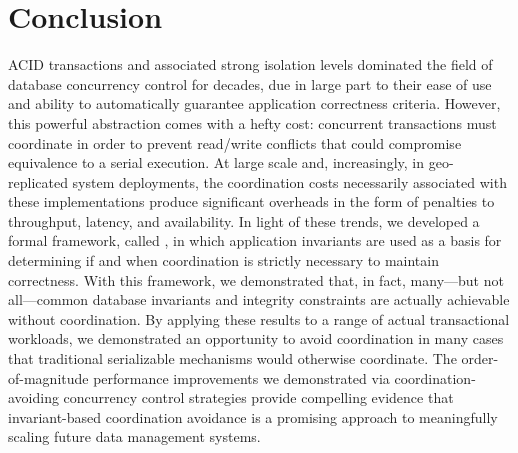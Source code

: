 
\section{Conclusion}
\label{sec:conclusion}

ACID transactions and associated strong isolation levels dominated the
field of database concurrency control for decades, due in large part
to their ease of use and ability to automatically guarantee
application correctness criteria. However, this powerful abstraction
comes with a hefty cost: concurrent transactions must coordinate in
order to prevent read/write conflicts that could compromise
equivalence to a serial execution. At large scale and, increasingly,
in geo-replicated system deployments, the coordination costs
necessarily associated with these implementations produce significant
overheads in the form of penalties to throughput, latency, and
availability. In light of these trends, we developed a formal
framework, called \fullnameconfluence, in which application invariants
are used as a basis for determining if and when coordination is
strictly necessary to maintain correctness. With this framework, we
demonstrated that, in fact, many---but not all---common database
invariants and integrity constraints are actually achievable without
coordination. By applying these results to a range of actual
transactional workloads, we demonstrated an opportunity to avoid
coordination in many cases that traditional serializable mechanisms
would otherwise coordinate. The order-of-magnitude performance
improvements we demonstrated via coordination-avoiding concurrency
control strategies provide compelling evidence that invariant-based
coordination avoidance is a promising approach to meaningfully scaling
future data management systems.
